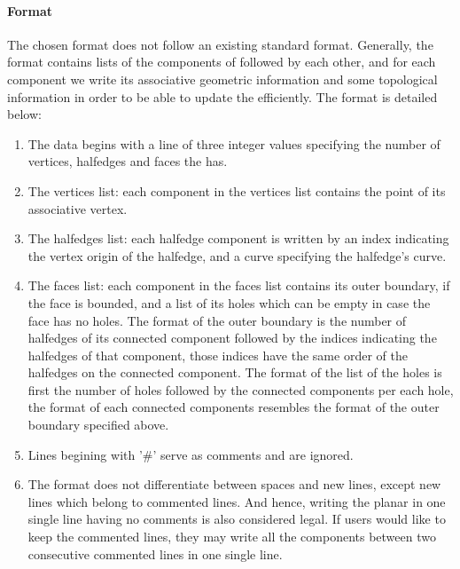 \begin{ccAdvanced}
\paragraph{Format}
The chosen format does not follow an existing standard format. 
Generally, the format contains lists of the components of 
 followed by each other, 
and for each component we write its associative geometric information and 
some topological information in order to be able to update 
the  efficiently. The format is detailed below:

\begin{enumerate}
\item The data begins with a line of three integer values specifying the number of vertices, 
halfedges and faces the  has.
\item The vertices list: each component in the vertices list contains the point of its associative vertex.
\item The halfedges list: each halfedge component is written by an index indicating the vertex origin 
of the halfedge, and a curve specifying the halfedge's curve.
\item The faces list: each component in the faces list contains its outer boundary, 
if the face is bounded, and a list of its holes which can be empty in case the face 
has no holes. The format of the outer boundary is the number of halfedges of its connected 
component followed by the indices indicating the halfedges of that component, those indices 
have the same order of the halfedges on the connected component. 
The format of the list of the holes is first the number of holes followed by the connected 
components per each hole, the format of each connected components resembles the format 
of the outer boundary specified above.
\item Lines begining with '\#' serve as comments and are ignored.
\item The format does not differentiate between spaces and new lines, 
except new lines which belong to commented lines. 
And hence, writing the planar in one single line having no comments is also considered legal. 
If users would like to keep the commented lines, they may write all the 
components between two consecutive commented lines in one single line.

\end{enumerate}



\end{ccAdvanced}
